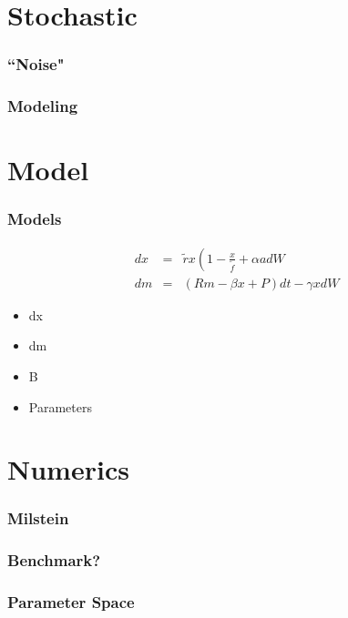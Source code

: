 



\section{Stochastic}

\begin{frame}
    \frametitle{``Noise"}
\end{frame}

\begin{frame}
    \frametitle{Modeling}
\end{frame}






\section{Model}

\begin{frame}
    \frametitle{Models}
	\begin{eqnarray}
		dx &=& \tilde{r} x \left( 1- \frac{x}{\tilde{f}} +\alpha a dW \\
		dm &=& (Rm - \beta x + P) dt - \gamma x dW
	\end{eqnarray}
	\begin{itemize}
		\item dx
		\item dm
		\item B
		\item Parameters
	\end{itemize}
\end{frame}





\section{Numerics}

\begin{frame}
    \frametitle{Milstein}
\end{frame}

\begin{frame}
    \frametitle{Benchmark?}
\end{frame}

\begin{frame}
    \frametitle{Parameter Space}
\end{frame}



